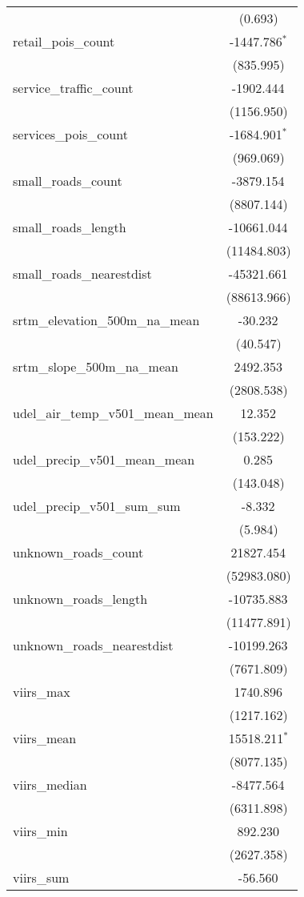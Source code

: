 \begin{table}[!htbp]
\begin{tabular}{@{\extracolsep{5pt}}lc}
  & (0.693) \\
 retail_pois_count & -1447.786$^{*}$ \\
  & (835.995) \\
 service_traffic_count & -1902.444$^{}$ \\
  & (1156.950) \\
 services_pois_count & -1684.901$^{*}$ \\
  & (969.069) \\
 small_roads_count & -3879.154$^{}$ \\
  & (8807.144) \\
 small_roads_length & -10661.044$^{}$ \\
  & (11484.803) \\
 small_roads_nearestdist & -45321.661$^{}$ \\
  & (88613.966) \\
 srtm_elevation_500m_na_mean & -30.232$^{}$ \\
  & (40.547) \\
 srtm_slope_500m_na_mean & 2492.353$^{}$ \\
  & (2808.538) \\
 udel_air_temp_v501_mean_mean & 12.352$^{}$ \\
  & (153.222) \\
 udel_precip_v501_mean_mean & 0.285$^{}$ \\
  & (143.048) \\
 udel_precip_v501_sum_sum & -8.332$^{}$ \\
  & (5.984) \\
 unknown_roads_count & 21827.454$^{}$ \\
  & (52983.080) \\
 unknown_roads_length & -10735.883$^{}$ \\
  & (11477.891) \\
 unknown_roads_nearestdist & -10199.263$^{}$ \\
  & (7671.809) \\
 viirs_max & 1740.896$^{}$ \\
  & (1217.162) \\
 viirs_mean & 15518.211$^{*}$ \\
  & (8077.135) \\
 viirs_median & -8477.564$^{}$ \\
  & (6311.898) \\
 viirs_min & 892.230$^{}$ \\
  & (2627.358) \\
 viirs_sum & -56.560$^{}$ \\

\end{tabular}
\end{table}
